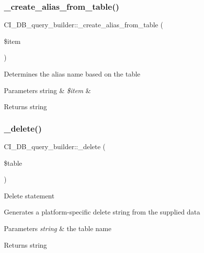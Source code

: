 \subsubsection{\texorpdfstring{\+\_\+create\+\_\+alias\+\_\+from\+\_\+table()}{\_create\_alias\_from\_table()}}
{\footnotesize\ttfamily C\+I\+\_\+\+D\+B\+\_\+query\+\_\+builder\+::\+\_\+create\+\_\+alias\+\_\+from\+\_\+table (\begin{DoxyParamCaption}\item[{}]{\$item }\end{DoxyParamCaption})\hspace{0.3cm}{\ttfamily [protected]}}

Determines the alias name based on the table


\begin{DoxyParams}[1]{Parameters}
string & {\em \$item} & \\
\hline
\end{DoxyParams}
\begin{DoxyReturn}{Returns}
string 
\end{DoxyReturn}
\mbox{\label{class_c_i___d_b__query__builder_afe8fd9a27e61e862c20116d365035b8c}} 
\subsubsection{\texorpdfstring{\+\_\+delete()}{\_delete()}}
{\footnotesize\ttfamily C\+I\+\_\+\+D\+B\+\_\+query\+\_\+builder\+::\+\_\+delete (\begin{DoxyParamCaption}\item[{}]{\$table }\end{DoxyParamCaption})\hspace{0.3cm}{\ttfamily [protected]}}

Delete statement

Generates a platform-\/specific delete string from the supplied data


\begin{DoxyParams}{Parameters}
{\em string} & the table name \\
\hline
\end{DoxyParams}
\begin{DoxyReturn}{Returns}
string 
\end{DoxyReturn}
\mbox{\label{class_c_i___d_b__query__builder_a87012ec307f0f3b7eb1b4bba68a20dd2}} 
